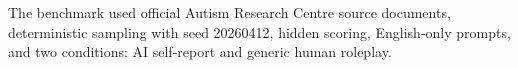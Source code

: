 The benchmark used official Autism Research Centre source documents, deterministic sampling with seed 20260412, hidden scoring, English-only prompts, and two conditions: AI self-report and generic human roleplay.
